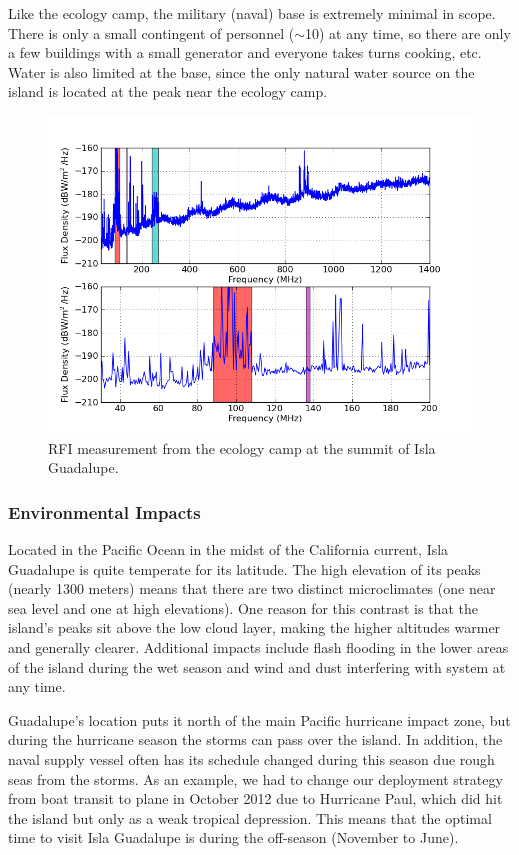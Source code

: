 Like the ecology camp, the military (naval) base is extremely minimal in scope. There is only a small contingent of personnel ($\sim$10) at any time, so there are only a few buildings with a small generator and everyone takes turns cooking, etc. Water is also limited at the base, since the only natural water source on the island is located at the peak near the ecology camp. 

\begin{figure}[tb]
\begin{center}
\includegraphics[width=0.9\linewidth]{RFI_testing/figures/GI_3__bands.png}
\caption{RFI measurement from the ecology camp at the summit of Isla Guadalupe.}
\label{Fig:guadsummit}
\end{center}
\end{figure}

\subsubsection{Environmental Impacts}

Located in the Pacific Ocean in the midst of the California current, Isla Guadalupe is quite temperate for its latitude. The high elevation of its peaks (nearly 1300 meters) means that there are two distinct microclimates (one near sea level and one at high elevations). One reason for this contrast is that the island's peaks sit above the low cloud layer, making the higher altitudes warmer and generally clearer. Additional impacts include flash flooding in the lower areas of the island during the wet season and wind and dust interfering with system at any time. 

Guadalupe's location puts it north of the main Pacific hurricane impact zone, but during the hurricane season the storms can pass over the island. In addition, the naval supply vessel often has its schedule changed during this season due rough seas from the storms. As an example, we had to change our deployment strategy from boat transit to plane in October 2012 due to Hurricane Paul, which did hit the island but only as a weak tropical depression. This means that the optimal time to visit Isla Guadalupe is during the off-season (November to June). 


